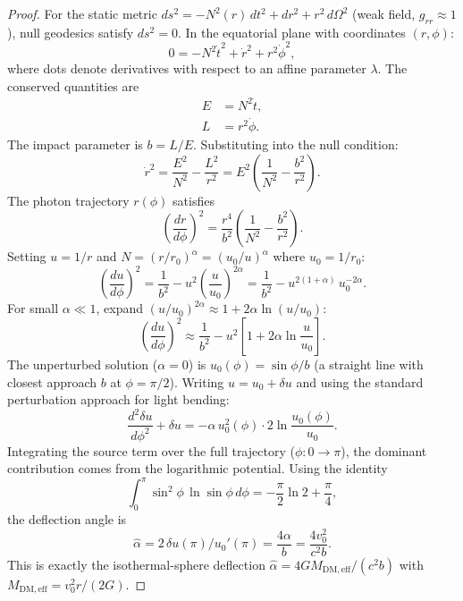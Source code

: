 \documentclass[11pt,a4paper]{article}
\theoremstyle{definition}
\newcommand{\eff}{\mathrm{eff}}
\newcommand{\DM}{\mathrm{DM}}
\begin{document}
\begin{proof}
For the static metric $ds^2 = -N^2(r)\,dt^2 + dr^2 + r^2\,d\Omega^2$ (weak field, $g_{rr}\approx 1$), null geodesics satisfy $ds^2 = 0$. In the equatorial plane with coordinates $(r, \phi)$:
\begin{equation}
0 = -N^2\dot{t}^2 + \dot{r}^2 + r^2\dot{\phi}^2,
\end{equation}
where dots denote derivatives with respect to an affine parameter $\lambda$. The conserved quantities are
\begin{align}
E &= N^2 \dot{t}, \\
L &= r^2 \dot{\phi}.
\end{align}
The impact parameter is $b = L/E$. Substituting into the null condition:
\begin{equation}
\dot{r}^2 = \frac{E^2}{N^2} - \frac{L^2}{r^2} = E^2\left(\frac{1}{N^2} - \frac{b^2}{r^2}\right).
\end{equation}
The photon trajectory $r(\phi)$ satisfies
\begin{equation}
\left(\frac{dr}{d\phi}\right)^2 = \frac{r^4}{b^2}\left(\frac{1}{N^2} - \frac{b^2}{r^2}\right).
\end{equation}
Setting $u = 1/r$ and $N = (r/r_0)^\alpha = (u_0/u)^\alpha$ where $u_0 = 1/r_0$:
\begin{equation}
\left(\frac{du}{d\phi}\right)^2 = \frac{1}{b^2} - u^2\left(\frac{u}{u_0}\right)^{2\alpha} = \frac{1}{b^2} - u^{2(1+\alpha)}\,u_0^{-2\alpha}.
\end{equation}
For small $\alpha \ll 1$, expand $(u/u_0)^{2\alpha} \approx 1 + 2\alpha\ln(u/u_0)$:
\begin{equation}
\left(\frac{du}{d\phi}\right)^2 \approx \frac{1}{b^2} - u^2\left[1 + 2\alpha\ln\frac{u}{u_0}\right].
\end{equation}
The unperturbed solution ($\alpha = 0$) is $u_0(\phi) = \sin\phi/b$ (a straight line with closest approach $b$ at $\phi = \pi/2$). Writing $u = u_0 + \delta u$ and using the standard perturbation approach for light bending:
\begin{equation}
\frac{d^2\delta u}{d\phi^2} + \delta u = -\alpha\,u_0^2(\phi)\cdot 2\ln\frac{u_0(\phi)}{u_0}.
\end{equation}
Integrating the source term over the full trajectory ($\phi: 0 \to \pi$), the dominant contribution comes from the logarithmic potential. Using the identity
\begin{equation}
\int_0^\pi \sin^2\phi\,\ln\sin\phi\,d\phi = -\frac{\pi}{2}\ln 2 + \frac{\pi}{4},
\end{equation}
the deflection angle is
\begin{equation}
\hat{\alpha} = 2\,\delta u(\pi)/u_0'(\pi) = \frac{4\alpha}{b} = \frac{4v_0^2}{c^2 b}.
\end{equation}
This is exactly the isothermal-sphere deflection $\hat{\alpha} = 4GM_{\DM,\eff}/(c^2 b)$ with $M_{\DM,\eff} = v_0^2 r/(2G)$.
\end{proof}
\end{document}
